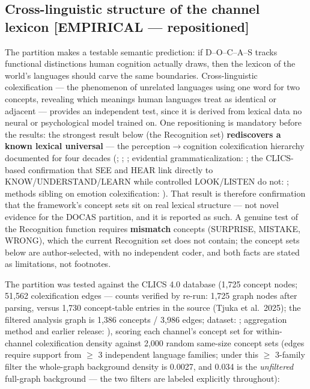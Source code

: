 \documentclass[11pt,twocolumn]{article}
\theoremstyle{plain}
\begin{document}
\subsection{Cross-linguistic structure of the channel lexicon [EMPIRICAL — repositioned]}

The partition makes a testable semantic prediction: if D–O–C–A–S tracks functional distinctions human cognition actually draws, then the lexicon of the world's languages should carve the same boundaries. Cross-linguistic colexification — the phenomenon of unrelated languages using one word for two concepts, revealing which meanings human languages treat as identical or adjacent — provides an independent test, since it is derived from lexical data no neural or psychological model trained on. One repositioning is mandatory before the results: the strongest result below (the Recognition set) \textbf{rediscovers a known lexical universal} — the perception$\to$cognition colexification hierarchy documented for four decades (\citealp{viberg1984}; \citealp{sweetser1990}; \citealp{evans2000}; evidential grammaticalization: \citealp{aikhenvald2004}; the CLICS-based confirmation that SEE and HEAR link directly to KNOW/UNDERSTAND/LEARN while controlled LOOK/LISTEN do not: \citealp{georgakopoulos2022}; methods sibling on emotion colexification: \citealp{jackson2019}). That result is therefore confirmation that the framework's concept sets sit on real lexical structure — not novel evidence for the DOCAS partition, and it is reported as such. A genuine test of the Recognition function requires \textbf{mismatch} concepts (SURPRISE, MISTAKE, WRONG), which the current Recognition set does not contain; the concept sets below are author-selected, with no independent coder, and both facts are stated as limitations, not footnotes.

The partition was tested against the CLICS 4.0 database (1,725 concept nodes; 51,562 colexification edges --- counts verified by re-run: 1,725 graph nodes after parsing, versus 1,730 concept-table entries in the source (Tjuka et al.\ 2025); the filtered analysis graph is 1,386 concepts / 3,986 edges; dataset: \citealp{tjuka2026}; aggregation method and earlier release: \citealp{rzymski2020}), scoring each channel's concept set for within-channel colexification density against 2,000 random same-size concept sets (edges require support from $\geq$ 3 independent language families; under this $\geq$ 3-family filter the whole-graph background density is 0.0027, and 0.034 is the \textit{unfiltered} full-graph background — the two filters are labeled explicitly throughout):
\end{document}
